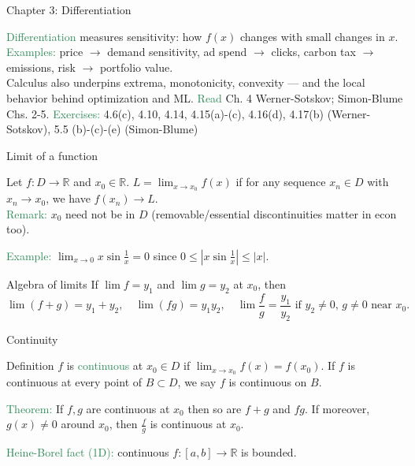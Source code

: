 \documentclass[11pt,aspectratio=169]{beamer}
\begin{document}
\begin{frame}{Chapter 3: Differentiation}

 \textcolor{SeaGreen}{Differentiation} measures sensitivity: how $f(x)$ changes with small changes in $x$.
\vskip 8pt
\textcolor{SeaGreen}{Examples:} price $\to$ demand sensitivity, ad spend $\to$ clicks, carbon tax $\to$ emissions, risk $\to$ portfolio value.\\[6pt]
Calculus also underpins extrema, monotonicity, convexity --- and the local behavior behind optimization and ML.
\vskip 6pt
\textcolor{SeaGreen}{Read} Ch. 4 Werner-Sotskov; Simon-Blume Chs. 2-5.
\vskip 12pt
\textcolor{SeaGreen}{Exercises:} 4.6(c), 4.10, 4.14, 4.15(a)-(c), 4.16(d), 4.17(b) (Werner-Sotskov), 5.5 (b)-(c)-(e) (Simon-Blume)

\end{frame}


\begin{frame}{Limit of a function}
\begin{alertblock}{}
Let $f:D  \rightarrow \mathbb{R}$ and $x_0 \in \mathbb{R}$. $L=\lim_{x\to x_0} f(x)$ if for any sequence $x_n\in D$ with $x_n\to x_0$, we have $f(x_n)\to L$. 	\\[2mm]
\textcolor{SeaGreen}{Remark:} $x_0$ need not be in $D$ (removable/essential discontinuities matter in econ too).
\end{alertblock}
 \textcolor{SeaGreen}{Example:} $\lim_{x \rightarrow 0} x \sin\frac{1}{x}=0$ since $0\leq | x \sin\frac{1}{x}| \leq |x|$.
\begin{block}{Algebra of limits}
If $\lim f = y_1$ and $\lim g = y_2$ at $x_0$, then
\[
\lim (f+g)=y_1+y_2,\quad 
\lim (fg)=y_1 y_2,\quad 
\lim \frac{f}{g}=\frac{y_1}{y_2}\text{ if }y_2\ne 0,\,g\ne 0\text{ near }x_0.
\]
\end{block}
\end{frame}

\begin{frame}{Continuity}

\begin{alertblock}{Definition}
$f$ is \textcolor{SeaGreen}{continuous} at $x_0\in D$ if $\lim_{x\to x_0} f(x)=f(x_0)$.
If $f$ is continuous at every point of $B\subset D$, we say $f$ is continuous on $B$.	
\end{alertblock}
\bigskip 


\textcolor{SeaGreen}{Theorem:} If $f,g$ are continuous at $x_0$ then so are $f+g$ and $f g$. If moreover,
$g(x)\neq 0$ around $x_0$, then $\frac{f}{g}$ is continuous at $x_0$.

\vskip 8pt
\textcolor{SeaGreen}{Heine-Borel fact (1D):} continuous $f:[a,b]\to\mathbb{R}$ is bounded.
\end{frame}
\end{document}
